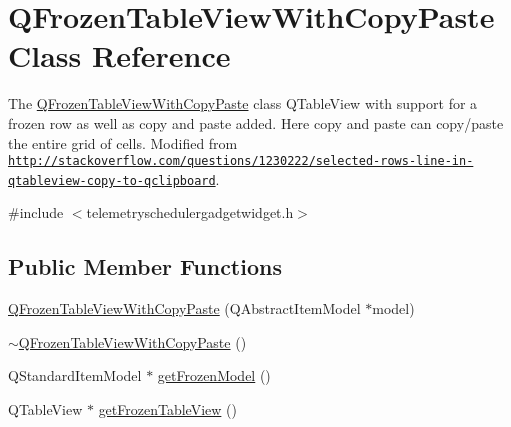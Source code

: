 \hypertarget{class_q_frozen_table_view_with_copy_paste}{\section{\-Q\-Frozen\-Table\-View\-With\-Copy\-Paste \-Class \-Reference}
\label{class_q_frozen_table_view_with_copy_paste}
}


\-The \hyperlink{class_q_frozen_table_view_with_copy_paste}{\-Q\-Frozen\-Table\-View\-With\-Copy\-Paste} class \-Q\-Table\-View with support for a frozen row as well as copy and paste added. \-Here copy and paste can copy/paste the entire grid of cells. \-Modified from \href{http://stackoverflow.com/questions/1230222/selected-rows-line-in-qtableview-copy-to-qclipboard}{\tt http\-://stackoverflow.\-com/questions/1230222/selected-\/rows-\/line-\/in-\/qtableview-\/copy-\/to-\/qclipboard}.  




{\ttfamily \#include $<$telemetryschedulergadgetwidget.\-h$>$}

\subsection*{\-Public \-Member \-Functions}
\begin{DoxyCompactItemize}
\item 
\hyperlink{group___telemetry_scheduler_gadget_plugin_gad6560fd1799cf89e95a319a596faea44}{\-Q\-Frozen\-Table\-View\-With\-Copy\-Paste} (\-Q\-Abstract\-Item\-Model $\ast$model)
\item 
\hyperlink{group___telemetry_scheduler_gadget_plugin_gacf27881593c1df76a7dad9ec53717a0f}{$\sim$\-Q\-Frozen\-Table\-View\-With\-Copy\-Paste} ()
\item 
\-Q\-Standard\-Item\-Model $\ast$ \hyperlink{group___telemetry_scheduler_gadget_plugin_ga7f698a3c329ebf8c55cddcf371f0b202}{get\-Frozen\-Model} ()
\item 
\-Q\-Table\-View $\ast$ \hyperlink{group___telemetry_scheduler_gadget_plugin_ga3ed87e397a7271b4bec6f92fb2e13842}{get\-Frozen\-Table\-View} ()
\end{DoxyCompactItemize}
